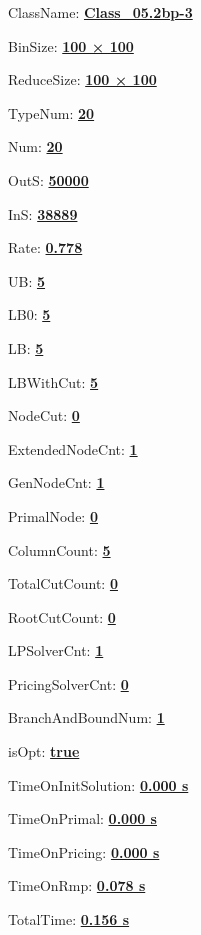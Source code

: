 \documentclass[11pt]{article}
\begin{document}
\pagestyle{empty}


ClassName: \underline{\textbf{Class_05.2bp-3}}
\par
BinSize: \underline{\textbf{100 × 100}}
\par
ReduceSize: \underline{\textbf{100 × 100}}
\par
TypeNum: \underline{\textbf{20}}
\par
Num: \underline{\textbf{20}}
\par
OutS: \underline{\textbf{50000}}
\par
InS: \underline{\textbf{38889}}
\par
Rate: \underline{\textbf{0.778}}
\par
UB: \underline{\textbf{5}}
\par
LB0: \underline{\textbf{5}}
\par
LB: \underline{\textbf{5}}
\par
LBWithCut: \underline{\textbf{5}}
\par
NodeCut: \underline{\textbf{0}}
\par
ExtendedNodeCnt: \underline{\textbf{1}}
\par
GenNodeCnt: \underline{\textbf{1}}
\par
PrimalNode: \underline{\textbf{0}}
\par
ColumnCount: \underline{\textbf{5}}
\par
TotalCutCount: \underline{\textbf{0}}
\par
RootCutCount: \underline{\textbf{0}}
\par
LPSolverCnt: \underline{\textbf{1}}
\par
PricingSolverCnt: \underline{\textbf{0}}
\par
BranchAndBoundNum: \underline{\textbf{1}}
\par
isOpt: \underline{\textbf{true}}
\par
TimeOnInitSolution: \underline{\textbf{0.000 s}}
\par
TimeOnPrimal: \underline{\textbf{0.000 s}}
\par
TimeOnPricing: \underline{\textbf{0.000 s}}
\par
TimeOnRmp: \underline{\textbf{0.078 s}}
\par
TotalTime: \underline{\textbf{0.156 s}}
\par
\newpage


\end{document}
